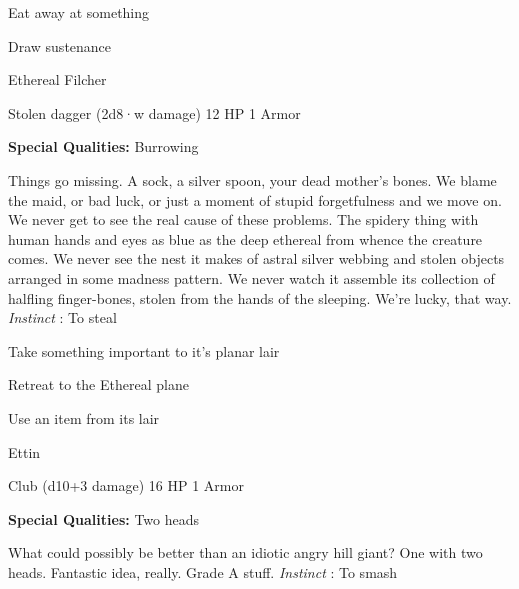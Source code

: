 \startitemize[1,packed]

\item Eat away at something

 
\item Draw sustenance


\stopitemize
 
\startMonsterName
Ethereal Filcher	 
\stopMonsterName
 

Stolen dagger (2d8·w damage)	12 HP	1 Armor

 


 
\startMonsterQualities
{\bf Special Qualities:}  Burrowing
\stopMonsterQualities
 
\startMonsterDescription
Things go missing. A sock, a silver spoon, your dead mother’s bones. We blame the maid, or bad luck, or just a moment of stupid forgetfulness and we move on. We never get to see the real cause of these problems. The spidery thing with human hands and eyes as blue as the deep ethereal from whence the creature comes. We never see the nest it makes of astral silver webbing and stolen objects arranged in some madness pattern. We never watch it assemble its collection of halfling finger-bones, stolen from the hands of the sleeping. We’re lucky, that way. {\em Instinct} : To steal
\stopMonsterDescription
 
\startitemize[1,packed]

\item Take something important to it's planar lair

 
\item Retreat to the Ethereal plane

 
\item Use an item from its lair


\stopitemize
 
\startMonsterName
Ettin	 
\stopMonsterName
 

Club (d10+3 damage)	16 HP	1 Armor

 


 
\startMonsterQualities
{\bf Special Qualities:}  Two heads
\stopMonsterQualities
 
\startMonsterDescription
What could possibly be better than an idiotic angry hill giant? One with two heads. Fantastic idea, really. Grade A stuff. {\em Instinct} : To smash
\stopMonsterDescription
 
